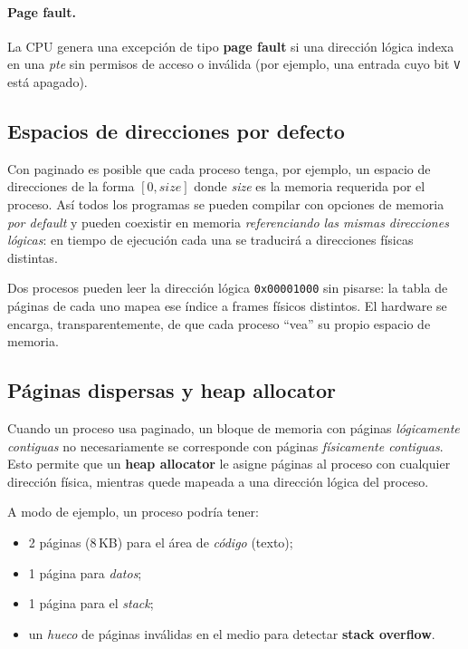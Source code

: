 \documentclass[11pt,a4paper]{article}
\begin{document}
\paragraph{Page fault.}
La CPU genera una excepción de tipo \textbf{page fault} si una dirección
lógica indexa en una \emph{pte} sin permisos de acceso o inválida (por
ejemplo, una entrada cuyo bit \texttt{V} está apagado).

\subsection{Espacios de direcciones por defecto}

Con paginado es posible que cada proceso tenga, por ejemplo, un espacio
de direcciones de la forma $[0, \textit{size}]$ donde \textit{size} es
la memoria requerida por el proceso. Así todos los programas se pueden
compilar con opciones de memoria \emph{por default} y pueden coexistir
en memoria \emph{referenciando las mismas direcciones lógicas}: en
tiempo de ejecución cada una se traducirá a direcciones físicas
distintas.

\begin{idea}
Dos procesos pueden leer la dirección lógica \texttt{0x00001000} sin
pisarse: la tabla de páginas de cada uno mapea ese índice a frames
físicos distintos. El hardware se encarga, transparentemente, de que
cada proceso ``vea'' su propio espacio de memoria.
\end{idea}

\subsection{Páginas dispersas y heap allocator}

Cuando un proceso usa paginado, un bloque de memoria con páginas
\emph{lógicamente contiguas} no necesariamente se corresponde con
páginas \emph{físicamente contiguas}. Esto permite que un
\textbf{heap allocator} le asigne páginas al proceso con cualquier
dirección física, mientras quede mapeada a una dirección lógica del
proceso.

A modo de ejemplo, un proceso podría tener:

\begin{itemize}[leftmargin=*,nosep]
    \item 2 páginas (8\,KB) para el área de \emph{código} (texto);
    \item 1 página para \emph{datos};
    \item 1 página para el \emph{stack};
    \item un \emph{hueco} de páginas inválidas en el medio para detectar
        \textbf{stack overflow}.
\end{itemize}
\end{document}
